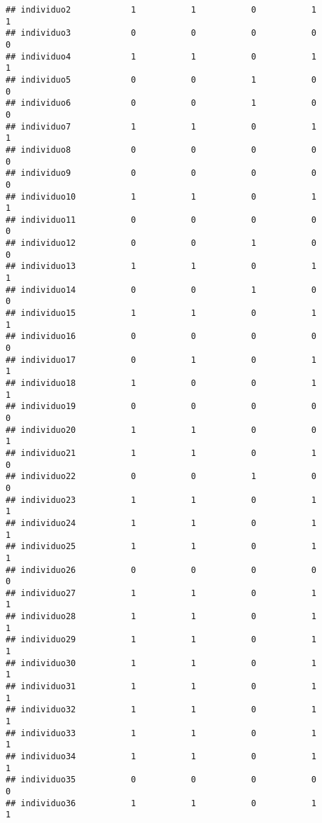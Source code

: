 \documentclass[
]{article}
\begin{document}
\begin{verbatim}
## individuo2            1           1           0           1           1
## individuo3            0           0           0           0           0
## individuo4            1           1           0           1           1
## individuo5            0           0           1           0           0
## individuo6            0           0           1           0           0
## individuo7            1           1           0           1           1
## individuo8            0           0           0           0           0
## individuo9            0           0           0           0           0
## individuo10           1           1           0           1           1
## individuo11           0           0           0           0           0
## individuo12           0           0           1           0           0
## individuo13           1           1           0           1           1
## individuo14           0           0           1           0           0
## individuo15           1           1           0           1           1
## individuo16           0           0           0           0           0
## individuo17           0           1           0           1           1
## individuo18           1           0           0           1           1
## individuo19           0           0           0           0           0
## individuo20           1           1           0           0           1
## individuo21           1           1           0           1           0
## individuo22           0           0           1           0           0
## individuo23           1           1           0           1           1
## individuo24           1           1           0           1           1
## individuo25           1           1           0           1           1
## individuo26           0           0           0           0           0
## individuo27           1           1           0           1           1
## individuo28           1           1           0           1           1
## individuo29           1           1           0           1           1
## individuo30           1           1           0           1           1
## individuo31           1           1           0           1           1
## individuo32           1           1           0           1           1
## individuo33           1           1           0           1           1
## individuo34           1           1           0           1           1
## individuo35           0           0           0           0           0
## individuo36           1           1           0           1           1

\end{verbatim}
\end{document}
